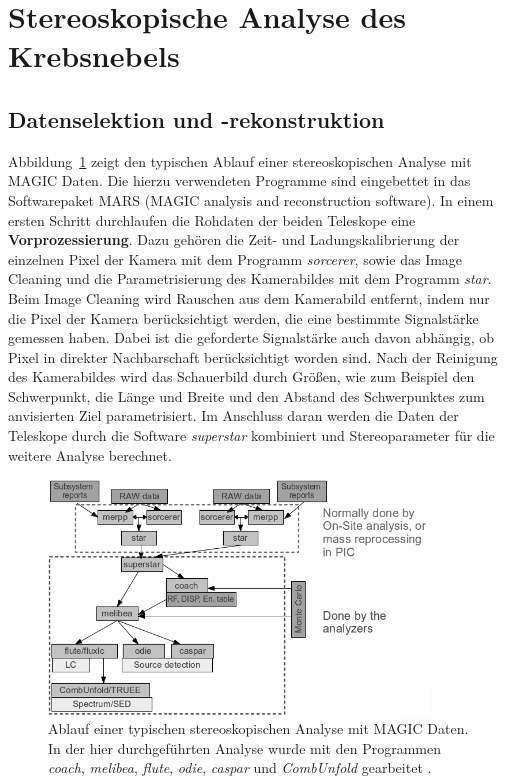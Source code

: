 \section{Stereoskopische Analyse des Krebsnebels}
\label{sec:analyse}

\subsection{Datenselektion und -rekonstruktion}

Abbildung~\ref{fig:analysischain} zeigt den typischen Ablauf einer
stereoskopischen Analyse mit MAGIC Daten. Die hierzu verwendeten Programme sind
eingebettet in das Softwarepaket MARS (MAGIC analysis and reconstruction
software). In einem ersten Schritt durchlaufen die
Rohdaten der beiden Teleskope eine \textbf{Vorprozessierung}. Dazu gehören die
Zeit- und Ladungskalibrierung der einzelnen Pixel der Kamera mit dem Programm
\textit{sorcerer}, sowie das Image Cleaning und die Parametrisierung des
Kamerabildes mit dem Programm \textit{star}. Beim Image Cleaning wird Rauschen
aus dem Kamerabild entfernt, indem nur die Pixel der Kamera berücksichtigt
werden, die eine bestimmte Signalstärke gemessen haben. Dabei ist die geforderte
Signalstärke auch davon abhängig, ob Pixel in direkter Nachbarschaft
berücksichtigt worden sind. Nach der Reinigung des Kamerabildes wird das
Schauerbild durch Größen, wie zum Beispiel den Schwerpunkt, die Länge und
Breite und den Abstand des Schwerpunktes zum anvisierten Ziel parametrisiert.
Im Anschluss daran werden die Daten der Teleskope durch die Software
\textit{superstar} kombiniert und Stereoparameter für die weitere Analyse
berechnet.

\begin{figure}[H]
  \centering
  \includegraphics[width=0.9\textwidth]{figures/analysischain.png}
  \caption{Ablauf einer typischen stereoskopischen Analyse mit MAGIC Daten. In
  der hier durchgeführten Analyse wurde mit den Programmen \textit{coach},
  \textit{melibea}, \textit{flute}, \textit{odie}, \textit{caspar} und
  \textit{CombUnfold} gearbeitet \cite{magic_wiki}.} %
  \label{fig:analysischain}
\end{figure}

